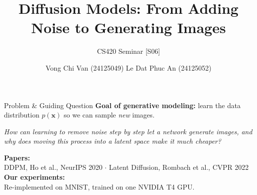 \documentclass[11pt,aspectratio=169]{beamer}
\title{Diffusion Models: From Adding Noise to Generating Images}
\subtitle{CS420 Seminar [S06]}
\author{Vong Chi Van (24125049) \quad Le Dat Phuc An (24125052)}
\institute{University of Science, VNU-HCM\\[2pt]
  \footnotesize\url{https://github.com/ChiVan222/AI_Seminar_Diffusion}}
\date{}
\newcommand{\Head}[1]{\textcolor{Main}{\textbf{#1}}}
\begin{document}
\begin{frame}
  \titlepage
\end{frame}

\begin{frame}{Problem \& Guiding Question}
  \Head{Goal of generative modeling:} learn the data distribution $p(\mathbf{x})$ so we can sample \emph{new} images.

  \vspace{0.45cm}
  \begin{center}
    \colorbox{Soft}{\parbox{\dimexpr\textwidth-2\fboxsep\relax}{\centering\vspace{5pt}
      \textit{How can learning to remove noise step by step let a network generate images, and why does moving this process into a latent space make it much cheaper?}\vspace{5pt}}}
  \end{center}

  \vspace{0.35cm}
  \small
  \textbf{Papers:} \\ DDPM, Ho et al., NeurIPS 2020 \cite{ho2020denoising} \;$\cdot$\;
  Latent Diffusion, Rombach et al., CVPR 2022 \cite{rombach2022high}\\
  \vspace{0.1cm}
  \textbf{Our experiments:} \\
  Re-implemented on MNIST, trained on one NVIDIA T4 GPU.
\end{frame}
\end{document}
